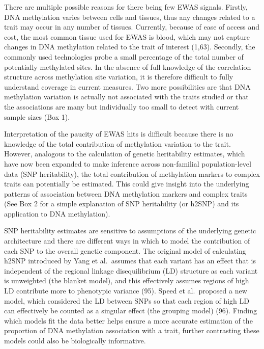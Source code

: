 \documentclass[11pt,oneside]{bristolthesis}
\begin{document}
There are multiple possible reasons for there being few EWAS signals. Firstly, DNA methylation varies between cells and tissues, thus any changes related to a trait may occur in any number of tissues. Currently, because of ease of access and cost, the most common tissue used for EWAS is blood, which may not capture changes in DNA methylation related to the trait of interest (1,63). Secondly, the commonly used technologies probe a small percentage of the total number of potentially methylated sites. In the absence of full knowledge of the correlation structure across methylation site variation, it is therefore difficult to fully understand coverage in current measures. Two more possibilities are that DNA methylation variation is actually not associated with the traits studied or that the associations are many but individually too small to detect with current sample sizes (Box 1).

Interpretation of the paucity of EWAS hits is difficult because there is no knowledge of the total contribution of methylation variation to the trait. However, analogous to the calculation of genetic heritability estimates, which have now been expanded to make inference across non-familial population-level data (SNP heritability), the total contribution of methylation markers to complex traits can potentially be estimated. This could give insight into the underlying patterns of association between DNA methylation markers and complex traits (See Box 2 for a simple explanation of SNP heritability (or h2SNP) and its application to DNA methylation).

SNP heritability estimates are sensitive to assumptions of the underlying genetic architecture and there are different ways in which to model the contribution of each SNP to the overall genetic component. The original model of calculating h2SNP introduced by Yang et al.~assumes that each variant has an effect that is independent of the regional linkage disequilibrium (LD) structure as each variant is unweighted (the blanket model), and this effectively assumes regions of high LD contribute more to phenotypic variance (95). Speed et al.~proposed a new model, which considered the LD between SNPs so that each region of high LD can effectively be counted as a singular effect (the grouping model) (96). Finding which models fit the data better helps ensure a more accurate estimation of the proportion of DNA methylation association with a trait, further contrasting these models could also be biologically informative.
\end{document}

